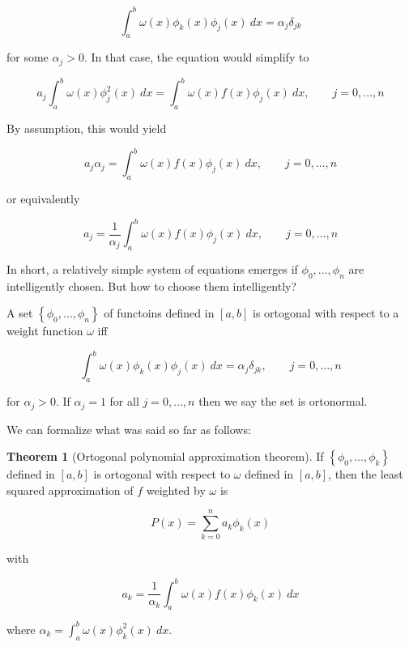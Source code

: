 \documentclass[12pt]{article}
\theoremstyle{definition}
\newtheorem{theorem}{Theorem}
\begin{document}
\begin{equation*}
    \int_a^b \omega(x) \phi_k(x) \phi_j(x) ~ dx = \alpha_j \delta_{jk}
\end{equation*}

for some $\alpha_j > 0$. In that case, the equation would simplify to 

\begin{equation*}
    a_j \int_a^b \omega(x) \phi_j^2(x) ~ dx = \int_a^b \omega(x) f(x) \phi_j(x)
    ~ dx, \qquad j = 0, \ldots, n
\end{equation*}

By assumption, this would yield

\begin{equation*}
    a_j \alpha_j = \int_a^b \omega(x) f(x) \phi_j(x)~ dx, \qquad j = 0, \ldots,
    n
\end{equation*}

or equivalently 

\begin{equation*}
    a_j = \frac{1}{\alpha_j} \int_a^b \omega(x) f(x) \phi_j(x) ~ dx, \qquad j =
    0, \ldots, n
\end{equation*}

In short, a relatively simple system of equations emerges if $\phi_0, \ldots,
\phi_n$ are intelligently chosen. But how to choose them intelligently? 

\begin{definition}
    A set $\left\{ \phi_0, \ldots, \phi_n \right\} $ of functoins defined in
    $[a, b]$ is ortogonal with respect to a weight function $\omega$ iff 

    \begin{equation*}
        \int_a^b \omega(x) \phi_k(x) \phi_j(x) ~ dx = \alpha_j \delta_{jk},
        \qquad j = 0, \ldots, n
    \end{equation*}

    for $\alpha_j > 0$. If $\alpha_j = 1$ for all $j = 0, \ldots, n$ then we say
    the set is ortonormal.
\end{definition}

We can formalize what was said so far as follows:

\begin{theorem}[Ortogonal polynomial approximation theorem]
    If $\left\{ \phi_0, \ldots, \phi_k \right\} $ defined in $[a, b]$ is
    ortogonal with respect to $\omega$ defined in $[a, b]$,
    then the least squared approximation of $f$ weighted by $\omega$ is 

    \begin{equation*}
        P(x) = \sum_{k=0}^n a_k \phi_k(x)
    \end{equation*}

    with 

    \begin{equation*}
        a_k = \frac{1}{\alpha_k} \int_a^b \omega(x) f(x) \phi_k(x) ~ dx
    \end{equation*}

    where $\alpha_k = \int_a^b \omega(x) \phi_k^2(x) ~ dx$.
\end{theorem}
\end{document}
